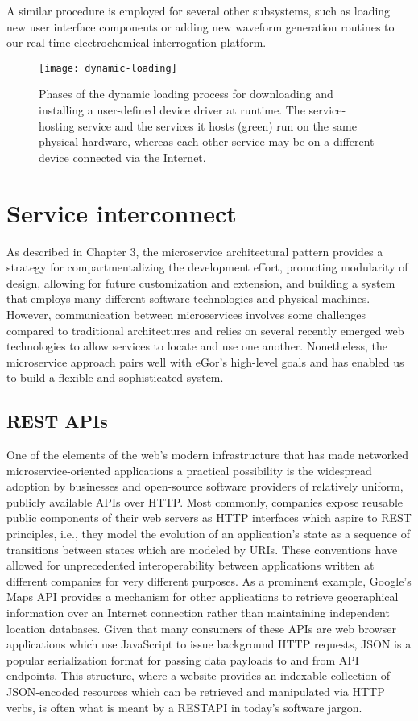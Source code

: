 \documentclass[../thesis]{subfiles}
\begin{document}
A similar procedure is employed for several other
subsystems, such as loading new user interface components or adding
new waveform generation routines to our real-time electrochemical
interrogation platform.

\begin{figure}
  \texttt{[image: dynamic-loading]}
  \caption[Dynamic loading of microservices]{
    Phases of the dynamic loading process for downloading and
    installing a user-defined device driver at runtime. The
    service-hosting service and the services it hosts (green)
    run on the same physical hardware, whereas each other service may
    be on a different device connected via the Internet.
    \label{fig:DynamicLoading}
  }
\end{figure}




\section{Service interconnect}
As described in Chapter 3, the microservice architectural pattern
provides a strategy for compartmentalizing the development effort,
promoting modularity of design, allowing for future customization and
extension, and building a system that employs many different software
technologies and physical machines. However, communication between
microservices involves some challenges compared to traditional
architectures and relies on several recently emerged web technologies
to allow services to locate and use one another. Nonetheless,
the microservice approach pairs well with eGor's high-level goals and
has enabled us to build a flexible and sophisticated system.

\subsection{REST APIs}
One of the elements of the web's modern infrastructure that has made
networked microservice-oriented applications a practical possibility
is the widespread adoption by businesses and open-source software
providers of relatively uniform, publicly available \glspl{API} over
HTTP. Most commonly, companies expose reusable public components of
their web servers as HTTP interfaces which aspire to \gls{REST}
principles, i.e., they model the evolution of an application's state
as a sequence of transitions between states which are modeled by
\glspl{URI}. These conventions have allowed for unprecedented
interoperability between applications written at different companies
for very different purposes. As a prominent example, Google's Maps
\gls{API} provides a mechanism for other applications to retrieve
geographical information over an Internet connection rather than
maintaining independent location databases. Given that many consumers
of these APIs are web browser applications which use JavaScript to
issue background HTTP requests, \gls{JSON} is a popular serialization
format for passing data payloads to and from API endpoints. This
structure, where a website provides an indexable collection of
\gls{JSON}-encoded resources which can be retrieved and manipulated
via HTTP verbs, is often what is meant by a \gls{RESTAPI} in today's
software jargon.
\end{document}
